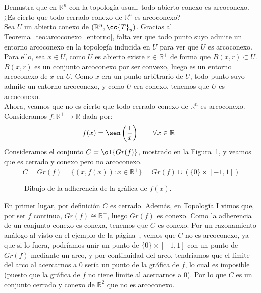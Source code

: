 \begin{ejercicio}
   Demustra que en $\mathbb{R}^n$  con la topología usual, todo abierto conexo es arcoconexo. ¿Es cierto que todo cerrado conexo de $\mathbb{R}^n$ es arcoconexo?\\

   \noindent
   Sea $U$ un abierto conexo de $(\mathbb{R}^n, \cc{T}_u)$. Gracias al Teorema~\ref{teo:arcoconexo_entorno}, falta ver que todo punto suyo admite un entorno arcoconexo en la topología inducida en $U$ para ver que $U$ es arcoconexo. Para ello, sea $x\in U$, como $U$ es abierto existe $r\in \mathbb{R}^+$ de forma que $B(x,r)\subset U$. $B(x,r)$ es un conjunto arcoconexo por ser convexo, luego es un entorno arcoconexo de $x$ en $U$. Como $x$ era un punto arbitrario de $U$, todo punto suyo admite un entorno arcoconexo, y como $U$ era conexo, tenemos que $U$ es arcoconexo.\\

   \noindent
   Ahora, veamos que no es cierto que todo cerrado conexo de $\mathbb{R}^n$ es arcoconexo. Consideramos $f:\mathbb{R}^+\to \mathbb{R}$ dada por:
   \begin{equation*}
       f(x) = \sen\left(\dfrac{1}{x}\right) \qquad \forall x\in \mathbb{R}^+
   \end{equation*}
   Consideramos el conjunto $C=\ol{Gr(f)}$, mostrado en la Figura~\ref{fig:adherencia_sin1x}, y veamos que es cerrado y conexo pero no arcoconexo.
   \begin{equation*}
       C = \overline{Gr(f)} = \overline{\{(x,f(x)) : x\in \mathbb{R}^+\}} = Gr(f) \cup (\{0\}\times [-1,1])
   \end{equation*}
   \begin{figure}
       \centering
        \caption{Dibujo de la adherencia de la gráfica de $f(x)$.}
        \label{fig:adherencia_sin1x}
   \end{figure}
   En primer lugar, por definición $C$ es cerrado. Además, en Topología I vimos que, por ser $f$ continua, $Gr(f)\cong \mathbb{R}^+$, luego $Gr(f)$ es conexo. Como la adherencia de un conjunto conexo es conexa, tenemos que $C$ es conexo. Por un razonamiento análogo al visto en el ejemplo de la página~\pageref{ej:conexo_no_arcoconexo}, vemos que $C$ no es arcoconexo, ya que si lo fuera, podríamos unir un punto de $\{0\}\times [-1,1]$ con un punto de $Gr(f)$ mediante un arco, y por continuidad del arco, tendríamos que el límite del arco al acercarnos a $0$ sería un punto de la gráfica de $f$, lo cual es imposible (puesto que la gráfica de $f$ no tiene límite al acercarnos a $0$). Por lo que $C$ es un conjunto cerrado y conexo de $\mathbb{R}^2$ que no es arcoconexo.
   

\end{ejercicio}
